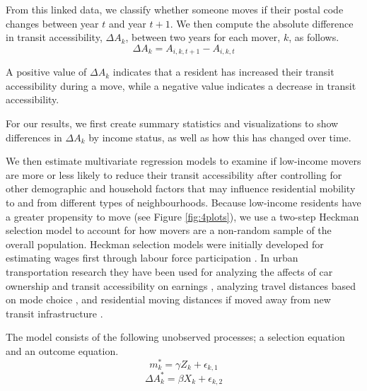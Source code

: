 From this linked data, we classify whether someone moves if their postal code changes between year $t$ and year $t + 1$. We then compute the absolute difference in transit accessibility, $\Delta A_{k}$, between two years for each mover, $k$, as follows.
\begin{equation}
\Delta A_{k} = A_{i,k,t + 1} - A_{i,k,t}
\end{equation}

A positive value of $\Delta A_{k}$ indicates that a resident has increased their transit accessibility during a move, while a negative value indicates a decrease in transit accessibility. 

For our results, we first create summary statistics and visualizations to show differences in $\Delta A_{k}$ by income status, as well as how this has changed over time. 

We then estimate multivariate regression models to examine if low-income movers are more or less likely to reduce their transit accessibility after controlling for other demographic and household factors that may influence residential mobility to and from different types of neighbourhoods. Because low-income residents have a greater propensity to move (see Figure \ref{fig:4plots}), we use a two-step Heckman selection model to account for how movers are a non-random sample of the overall population. Heckman selection models were initially developed for estimating wages first through labour force participation \cite{heckman_shadow_1974}. In urban transportation research they have been used for analyzing the affects of car ownership and transit accessibility on earnings \cite{smart_disentangling_2020}, analyzing travel distances based on mode choice \cite{kaplan_walking_2016}, and residential moving distances if moved away from new transit infrastructure \cite{chu_impacts_2017}.

The model consists of the following unobserved processes; a selection equation and an outcome equation.
\begin{equation}
m_k^* = \gamma Z_k  + \epsilon_{k,1}
\end{equation}
\begin{equation}
\Delta A_{k}^* = \beta X_{k} + \epsilon_{k,2}
\end{equation}

